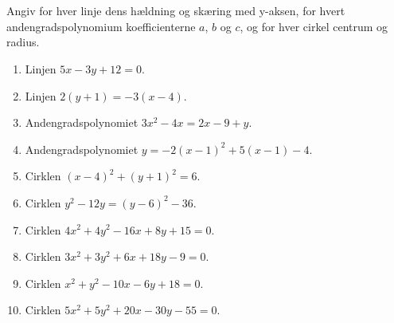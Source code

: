 \documentclass[10pt,a4paper,table]{article}
\begin{document}
\thispagestyle{plain}

\section{}
\subsection{}

Angiv for hver linje dens h\ae ldning og sk\ae ring med y-aksen, for hvert andengradspolynomium koefficienterne $a$, $b$ og $c$, og for hver cirkel centrum og radius.
\begin{enumerate}[label=\arabic*)]
  \item Linjen $5x - 3y + 12 = 0$.
  \item Linjen $2(y + 1) = -3(x - 4)$.
  \item Andengradspolynomiet $3x^2 - 4x = 2x - 9+y$.
  \item Andengradspolynomiet $y=-2(x - 1)^2 + 5(x - 1) - 4$.
  \item Cirklen $(x-4)^2 + (y+1)^2 = 6$.
  \item Cirklen $y^2 - 12y = (y-6)^2 - 36$.
  \item Cirklen $4x^2 + 4y^2 - 16x + 8y + 15 = 0$.
  \item Cirklen $3x^2 + 3y^2 + 6x + 18y - 9 = 0$.
  \item Cirklen $x^2 + y^2 - 10x - 6y + 18 = 0$.
  \item Cirklen $5x^2 + 5y^2 + 20x - 30y - 55 = 0$.
\end{enumerate}
\end{document}
